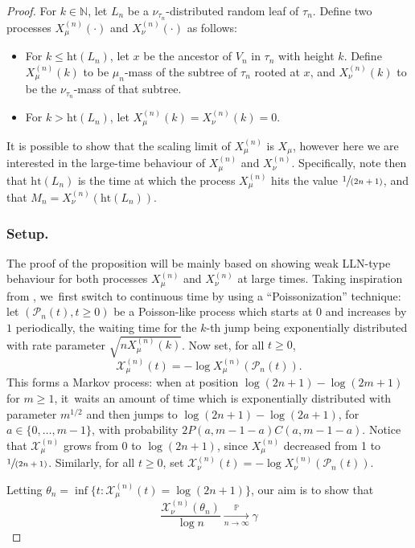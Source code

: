 \documentclass[11pt]{article}
\newcommand{\spfrac}[2]{\sfrac{#1}{(#2)}}
\newcommand{\xnun}{X^{(n)}_{\nu}}
\newcommand{\xmun}{X^{(n)}_{\mu}}
\newcommand{\Xmun}{\mathcal{X}^{(n)}_{\mu}}
\newcommand{\Xnun}{\mathcal{X}^{(n)}_{\nu}}
\let\dH\gamma
\newcommand{\N}{\mathbb{N}}
\newcommand{\pr}{\mathbb{P}}
\newcommand{\h}{\mathrm{ht}}
\theoremstyle{definition}
\begin{document}
\begin{proof} For $k\in\N$, let $L_n$ be a $\nu_{\tau_n}$-distributed random leaf of $\tau_n$. Define two processes $\xmun(\cdot)$ and $\xnun(\cdot)$ as follows:
\begin{itemize}
\item For $k \leq \mathrm{ht}(L_n)$, let $x$ be the ancestor of $V_n$ in $\tau_n$ with height $k$. Define $\xmun(k)$ to be $\mu_n$-mass of the subtree of $\tau_n$ rooted at $x$, and $\xnun(k)$ to be the $\nu_{\tau_n}$-mass of that subtree.
\item For $ k> \mathrm{ht}(L_n)$, let $\xmun(k)=\xnun(k)=0$.
\end{itemize}
It is possible to show that the scaling limit of $\xmun$ is $X_\mu$, however here we are interested in the large-time behaviour of $\xmun$ and $\xnun$. Specifically, note then that $\h(L_n)$ is the time at which the process $X^{(n)}_{\mu}$ hits the value $\spfrac1{2n+1}$, and that $M_n=X^{(n)}_{\nu}(\h(L_n))$.

\subsubsection*{Setup.}
The proof of the proposition will be mainly based on showing weak LLN-type behaviour for both processes $X^{(n)}_{\mu}$ and $X^{(n)}_{\nu}$ at large times. Taking inspiration from \cite{BK14}, we~first switch to continuous time by using a ``Poissonization'' technique: let $(\mathcal{P}_n(t),t\geq 0)$ be a Poisson-like process which starts at $0$ and increases by $1$ periodically, the waiting time for the $k$-th jump being exponentially distributed with rate parameter $\sqrt{nX^{(n)}_{\mu}(k)}$. Now set, for all $t\geq0$,\vspace*{-3pt}
\[
\mathcal{X}^{(n)}_{\mu}(t)=-\log X^{(n)}_{\mu}(\mathcal{P}_n(t)).
\]
This forms a Markov process: when at position $\log (2n+1) -\log (2m+1)$ for $m\geq 1$, it~waits an amount of time which is exponentially distributed with parameter $m^{1/2}$ and then jumps to $\log (2n+1) -\log (2a+1)$, for $a\in\{0,\ldots,m-1\}$, with probability $2P(a,m-1-a)C(a,m-1-a)$. Notice that $\mathcal{X}^{(n)}_{\mu}$ grows from $0$ to $\log(2n+1)$, since $X^{(n)}_{\mu}$ decreased from 1 to $\spfrac1{2n+1}$. Similarly, for all $t\geq0$, set $\mathcal{X}^{(n)}_{\nu}(t)=-\log X^{(n)}_{\nu}(\mathcal{P}_n(t))$.

Letting $\theta_n=\inf\{t: \Xmun(t) = \log (2n+1)\}$, our aim is to show that\vspace*{-3pt}
\begin{equation}\label{eq:loglimittimeprob0}
\frac{ \Xnun(\theta_n)}{\log n} \xrightarrow[\textstyle n\to\infty]{\textstyle\pr} \dH
\end{equation}


\end{proof}
\end{document}
